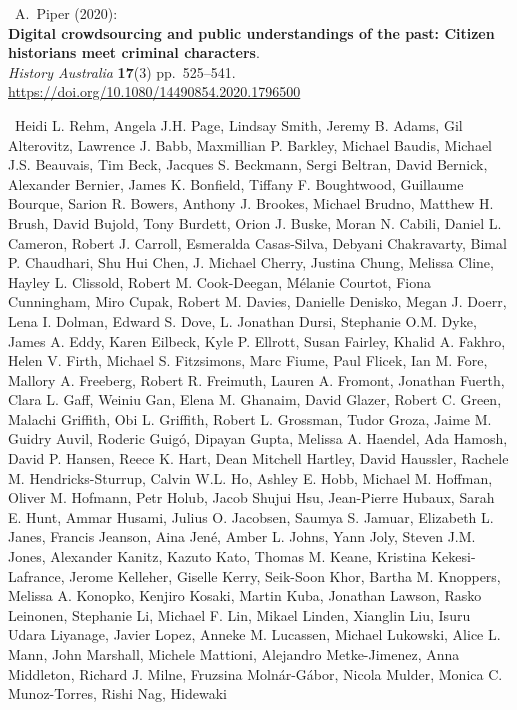 \begin{thebibliography}{9}
~A.~Piper (2020):\\
\textbf{Digital crowdsourcing and public understandings of the past:
Citizen historians meet criminal characters}.\\
\emph{History Australia} \textbf{17}(3) pp.~525--541.\\
\url{https://doi.org/10.1080/14490854.2020.1796500}


~Heidi L. Rehm, Angela J.H. Page, Lindsay Smith, Jeremy B.
Adams, Gil Alterovitz, Lawrence J. Babb, Maxmillian P. Barkley, Michael
Baudis, Michael J.S. Beauvais, Tim Beck, Jacques S. Beckmann, Sergi
Beltran, David Bernick, Alexander Bernier, James K. Bonfield, Tiffany F.
Boughtwood, Guillaume Bourque, Sarion R. Bowers, Anthony J. Brookes,
Michael Brudno, Matthew H. Brush, David Bujold, Tony Burdett, Orion J.
Buske, Moran N. Cabili, Daniel L. Cameron, Robert J. Carroll, Esmeralda
Casas-Silva, Debyani Chakravarty, Bimal P. Chaudhari, Shu Hui Chen, J.
Michael Cherry, Justina Chung, Melissa Cline, Hayley L. Clissold, Robert
M. Cook-Deegan, Mélanie Courtot, Fiona Cunningham, Miro Cupak, Robert M.
Davies, Danielle Denisko, Megan J. Doerr, Lena I. Dolman, Edward S.
Dove, L. Jonathan Dursi, Stephanie O.M. Dyke, James A. Eddy, Karen
Eilbeck, Kyle P. Ellrott, Susan Fairley, Khalid A. Fakhro, Helen V.
Firth, Michael S. Fitzsimons, Marc Fiume, Paul Flicek, Ian M. Fore,
Mallory A. Freeberg, Robert R. Freimuth, Lauren A. Fromont, Jonathan
Fuerth, Clara L. Gaff, Weiniu Gan, Elena M. Ghanaim, David Glazer,
Robert C. Green, Malachi Griffith, Obi L. Griffith, Robert L. Grossman,
Tudor Groza, Jaime M. Guidry Auvil, Roderic Guigó, Dipayan Gupta,
Melissa A. Haendel, Ada Hamosh, David P. Hansen, Reece K. Hart, Dean
Mitchell Hartley, David Haussler, Rachele M. Hendricks-Sturrup, Calvin
W.L. Ho, Ashley E. Hobb, Michael M. Hoffman, Oliver M. Hofmann, Petr
Holub, Jacob Shujui Hsu, Jean-Pierre Hubaux, Sarah E. Hunt, Ammar
Husami, Julius O. Jacobsen, Saumya S. Jamuar, Elizabeth L. Janes,
Francis Jeanson, Aina Jené, Amber L. Johns, Yann Joly, Steven J.M.
Jones, Alexander Kanitz, Kazuto Kato, Thomas M. Keane, Kristina
Kekesi-Lafrance, Jerome Kelleher, Giselle Kerry, Seik-Soon Khor, Bartha
M. Knoppers, Melissa A. Konopko, Kenjiro Kosaki, Martin Kuba, Jonathan
Lawson, Rasko Leinonen, Stephanie Li, Michael F. Lin, Mikael Linden,
Xianglin Liu, Isuru Udara Liyanage, Javier Lopez, Anneke M. Lucassen,
Michael Lukowski, Alice L. Mann, John Marshall, Michele Mattioni,
Alejandro Metke-Jimenez, Anna Middleton, Richard J. Milne, Fruzsina
Molnár-Gábor, Nicola Mulder, Monica C. Munoz-Torres, Rishi Nag, Hidewaki

\end{thebibliography}
